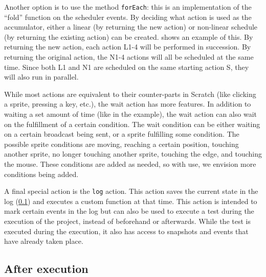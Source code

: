 \documentclass[../main]{subfiles}
\begin{document}
Another option is to use the method \texttt{forEach}: this is an implementation of the ``fold'' function on the scheduler events.
By deciding what action is used as the accumulator, either a linear (by returning the new action) or non-linear schedule (by returning the existing action) can be created.
 shows an example of this.
By returning the new action, each action L1-4 will be performed in succession.
By returning the original action, the N1-4 actions will all be scheduled at the same time.
Since both L1 and N1 are scheduled on the same starting action S, they will also run in parallel.

While most actions are equivalent to their counter-parts in Scratch (like clicking a sprite, pressing a key, etc.), the wait action has more features.
In addition to waiting a set amount of time (like in the example), the wait action can also wait on the fulfillment of a certain condition.
The wait condition can be either waiting on a certain broadcast being sent, or a sprite fulfilling some condition.
The possible sprite conditions are moving, reaching a certain position, touching another sprite, no longer touching another sprite, touching the edge, and touching the mouse.
These conditions are added as needed, so with use, we envision more conditions being added.

A final special action is the \texttt{log} action.
This action saves the current state in the log (\cref{subsec:after-execution}) and executes a custom function at that time.
This action is intended to mark certain events in the log but can also be used to execute a test during the execution of the project, instead of beforehand or afterwards.
While the test is executed during the execution, it also has access to snapshots and events that have already taken place.

\subsection{After execution}\label{subsec:after-execution}
\end{document}
